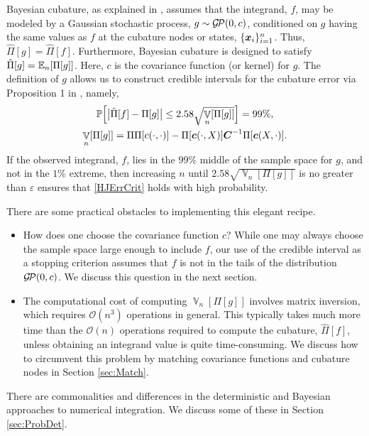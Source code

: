 \documentclass[sts]{imsart}
\numberwithin{equation}{section}
\theoremstyle{plain}
\newcommand{\vC}{\boldsymbol{C}}
\newcommand{\calGP}{\cg\!\cp}
\DeclareMathOperator{\Var}{\mathbb{V}}
\newcommand{\BOGOS}{\citetalias{BriEtal18a}}%
\begin{document}
Bayesian cubature, as explained in \BOGOS{}, assumes that the integrand, $f$, may be modeled by a Gaussian stochastic process, $g \sim \calGP(0,c)$, conditioned on $g$ having the same values as $f$ at the cubature nodes or states, $\{\boldsymbol{x}_i\}_{i=1}^n$.  Thus, $\hat{\Pi}[g] = \hat{\Pi}[f]$.  Furthermore, Bayesian cubature is designed to satisfy $\hat{\Pi}[g] = \operatorname{\mathbb{E}}_n[\Pi[g]]$.  Here, $c$ is the covariance function (or kernel) for $g$.  The definition of $g$ allows us to construct credible intervals for the cubature error via Proposition 1 in  \BOGOS{}, namely,
\begin{gather}
\label{credInt}
    \Prob\Bigl[\bigl \lvert \hat{\Pi}[f] - \Pi[g] \bigr \rvert \le 2.58 \sqrt{\Var_n[\Pi[g]]}  \Bigr] = 99\%, \\
    \label{Vnform}
    \Var_n[\Pi[g]] = \Pi\Pi[c(\cdot,\cdot)] - \Pi[\vc(\cdot,X)] \vC^{-1} \Pi[\vc(X,\cdot)].
\end{gather}
If the observed integrand, $f$, lies in the $99\%$ middle of the sample space for $g$, and not in the $1\%$ extreme, then increasing $n$ until $2.58 \sqrt{\Var_n[\Pi[g]]}$ is no greater than $\varepsilon$ ensures that  \eqref{HJErrCrit} holds with high probability.

There are some practical obstacles to implementing this elegant recipe. 

\begin{itemize} 

\item How does one choose the covariance function $c$?  While one may always choose the sample space large enough to include $f$, our use of the credible interval as a stopping criterion assumes that $f$ is not in the tails of the distribution $\calGP(0,c)$.  We discuss this question in the next section.  

\item The computational cost of computing $\Var_n[\Pi[g]]$ involves matrix inversion, which requires $\mathcal{O}(n^3)$ operations in general.  This typically takes much more time than the $\mathcal{O}(n)$ operations required to compute the cubature, $\hat{\Pi}[f]$, unless obtaining an integrand value is quite time-consuming. We discuss how to circumvent this problem by matching covariance functions and cubature nodes in Section \ref{sec:Match}.

\end{itemize}
There are commonalities and differences in the deterministic and Bayesian approaches to numerical integration.  We discuss some of these in Section \ref{sec:ProbDet}.
\end{document}
